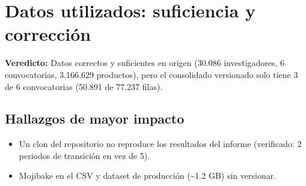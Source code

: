 \section{Datos utilizados: suficiencia y corrección}

\begin{tcolorbox}[hallazgo]
\textbf{Veredicto:} Datos correctos y suficientes en origen (30.086 investigadores, 6 convocatorias, 3.166.629 productos), pero el consolidado versionado solo tiene 3 de 6 convocatorias (50.891 de 77.237 filas).

\end{tcolorbox}

\subsection{Hallazgos de mayor impacto}

\begin{itemize}
  \item Un clon del repositorio no reproduce los resultados del informe (verificado: 2 periodos de transición en vez de 5).
  \item Mojibake en el CSV y dataset de producción (\textasciitilde{}1.2 GB) sin versionar.
\end{itemize}
